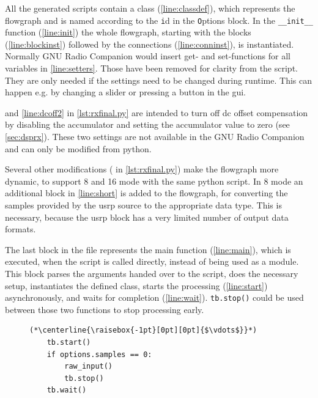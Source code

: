 \documentclass[12pt,a4paper,parskip=full,abstracton]{scrartcl}
\begin{document}
All the generated scripts contain a class (\cref{line:classdef}), which represents the flowgraph
and is named according to the {\texttt id} in the {\texttt Options} block. In the
\lstinline{__init__} function (\cref{line:init}) the whole flowgraph,
starting with the blocks (\cref{line:blockinst}) followed by the connections
(\cref{line:conninst}), is instantiated. Normally GNU Radio Companion would insert get- and set-functions for all
variables in \cref{line:setters}. Those have been removed for clarity from the
script. They are only needed if the settings need to be changed during runtime.
This can happen e.g. by changing a slider or pressing a button in the
\gls{gui}.

 and \cref{line:dcoff2} in \cref{lst:rxfinal.py} are intended to turn off \gls{dc} offset
compensation by disabling the accumulator and setting the accumulator value to zero 
(see \cref{sec:dsprx}). These two settings are not available in the GNU Radio Companion and can only
be modified from python.

Several other modifications ( in \cref{lst:rxfinal.py})
make the flowgraph more dynamic, to support \SI{8}{\bit} and \SI{16}{\bit} mode with
the same python script. In \SI{8}{\bit} mode an additional block in \cref{line:short}
is added to the flowgraph, for converting the samples provided by the \gls{usrp} source
to the appropriate data type. This is necessary, because the \gls{usrp} block has a
very limited number of output data formats.

The last block in the file represents the main function (\cref{line:main}),
which is executed, when the script is called directly, instead of being
used as a module. This block parses the arguments handed over to the script,
does the necessary setup, instantiates the defined class, starts the processing
(\cref{line:start}) asynchronously, and waits for completion (\cref{line:wait}).
\lstinline{tb.stop()} could be used between those two functions to
stop processing early.

\begin{figure}[htbp]
    \centering
    \begin{lstlisting}[basicstyle=\tiny,caption={Excerpt from ({\ttfamily tx\_final.py)} demonstrating stop.},label=lst:txfinal.py]
    (*\centerline{\raisebox{-1pt}[0pt][0pt]{$\vdots$}}*)
    tb.start()
    if options.samples == 0:
        raw_input() 
        tb.stop()
    tb.wait()
    \end{lstlisting}
\end{figure}
\end{document}
